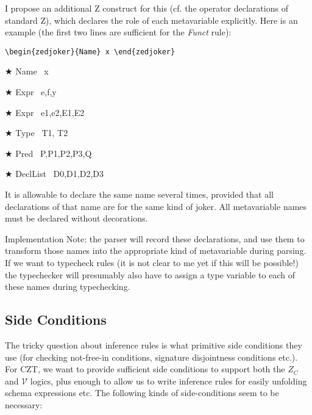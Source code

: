 \documentclass{article}
\newcommand{\V}{\mathcal{V}}
\newenvironment{zedjoker}[1]{\par$\bigstar$ #1\ }{}
\begin{document}
I propose an additional Z construct for this (cf. the operator
declarations of standard Z), which declares the role of each metavariable
explicitly.  Here is an example (the first two lines are sufficient for
the \emph{Funct} rule):

\begin{verbatim}
\begin{zedjoker}{Name} x \end{zedjoker}
\end{verbatim}

\begin{zedjoker}{Name} x \end{zedjoker}
\begin{zedjoker}{Expr} e,f,y \end{zedjoker}
\begin{zedjoker}{Expr} e1,e2,E1,E2 \end{zedjoker}
\begin{zedjoker}{Type} T1, T2 \end{zedjoker}
\begin{zedjoker}{Pred} P,P1,P2,P3,Q \end{zedjoker}
\begin{zedjoker}{DeclList} D0,D1,D2,D3 \end{zedjoker}

It is allowable to declare the same name several times, provided
that all declarations of that name are for the same kind of joker.
All metavariable names must be declared without decorations.  

Implementation Note: the parser will record these declarations,
and use them to transform those names into the appropriate kind
of metavariable during parsing.  If we want to typecheck rules
(it is not clear to me yet if this will be possible!) the typechecker will
presumably also have to assign a type variable to each of these names
during typechecking.


\subsection{Side Conditions}

The tricky question about inference rules is what primitive
side conditions they use (for checking not-free-in conditions,
signature disjointness conditions etc.).  
For CZT, we want to provide sufficient side conditions
to support both the $Z_C$ and $\V$ logics, plus enough to
allow us to write inference rules for easily unfolding schema
expressions etc.  The following kinds of side-conditions seem
to be necessary:
\end{document}
